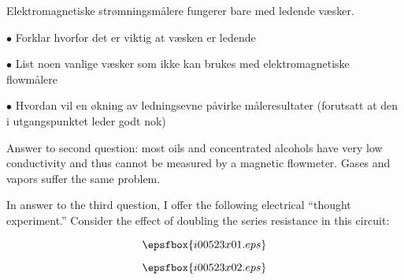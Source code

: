 

Elektromagnetiske str{\o}mningsm{\aa}lere fungerer bare med ledende v{\ae}sker. 
\medskip
\item{$\bullet$} Forklar hvorfor det er viktig at v{\ae}sken er ledende 
\item{$\bullet$} List noen vanlige v{\ae}sker som ikke kan brukes med elektromagnetiske flowm{\aa}lere
\item{$\bullet$} Hvordan vil en {\o}kning av ledningsevne p{\aa}virke m{\aa}leresultater (forutsatt at den i utgangspunktet leder godt nok)







Answer to second question: most oils and concentrated alcohols have very low conductivity and thus cannot be measured by a magnetic flowmeter.  Gases and vapors suffer the same problem.

\vskip 10pt

In answer to the third question, I offer the following electrical ``thought experiment.''  Consider the effect of doubling the series resistance in this circuit:

$$\epsfbox{i00523x01.eps}$$

\vskip 10pt

$$\epsfbox{i00523x02.eps}$$












